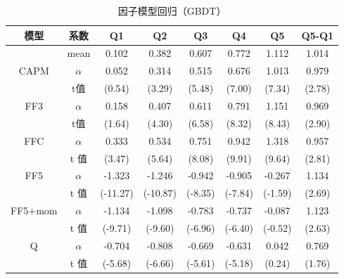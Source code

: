 \begin{table}[htbp]
\caption{因子模型回归（GBDT）}
\label{factor2}
\begin{tabular*}{\hsize}{@{\hskip\tabcolsep\extracolsep\fill}*{8}{c}}
\toprule
模型                       & 系数                    & Q1 & Q2 & Q3 & Q4 & Q5 & Q5-Q1 \\ \midrule
 & mean&  0.102&  0.382& 0.607& 0.772&   1.112&1.014\\
 \multirow{2}{*}{CAPM}     & $\alpha$ &     0.052        &    0.314&    0.515&    0.676&    1.013& 0.979      \\
                         & t值                     &     (0.54)         &   (3.29)         &   (5.48)         &   (7.00)         &   (7.34)       &  (2.78)        \\
\multirow{2}{*}{FF3}     & $\alpha$ &     0.158         &    0.407&    0.611&    0.791&    1.151&  0.969       \\
                         & t值                     &     (1.64)         &   (4.30)         &   (6.58)         &   (8.32)         &   (8.43)            &   (2.90)        \\
\multirow{2}{*}{FFC}     & $\alpha$  &   0.333&    0.534&    0.751&    0.942&    1.318&    0.957 \\
                         & t 值                   &    (3.47)         &   (5.64)         &   (8.08)         &   (9.91)         &   (9.64)              &   (2.81)           \\
\multirow{2}{*}{FF5}     &$\alpha$  &-1.323&   -1.246&   -0.942&   -0.905&   -0.267    &     1.134  \\
                         & t  值                   &   (-11.27)         & (-10.87)         &  (-8.35)         &  (-7.84)         &  (-1.59)   &   (2.69)         \\
\multirow{2}{*}{FF5+mom} &$\alpha$  &-1.134&   -1.098&   -0.783&   -0.737&  -0.087   &  1.123    \\
                         & t  值                   &   (-9.71)         &  (-9.60)         &  (-6.96)         &  (-6.40)         &  (-0.52)      &   (2.63)       \\
\multirow{2}{*}{Q}       &$\alpha$  &-0.704&   -0.808&   -0.669&   -0.631&   0.042   &   0.769       \\
                         & t   值                  &   (-5.68)         &  (-6.66)         &  (-5.61)         &  (-5.18)         &   (0.24)       &   (1.76)     \\ \bottomrule
\end{tabular*}
\end{table}

